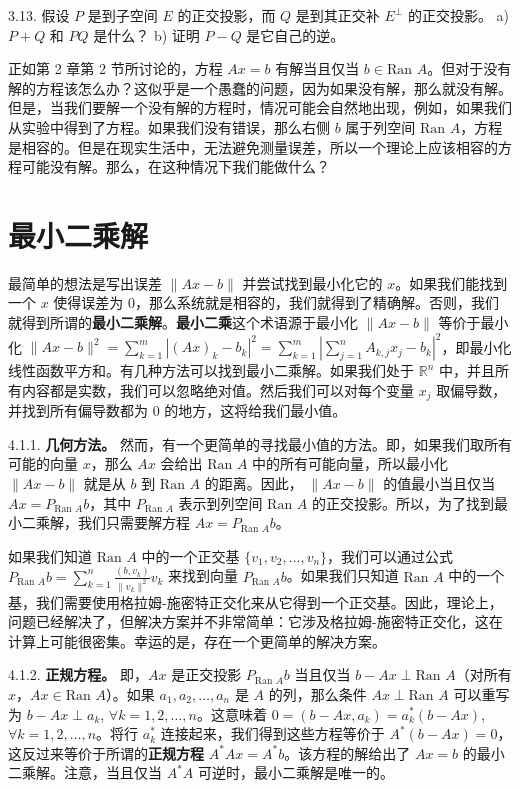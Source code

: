 3.13. 假设 $P$ 是到子空间 $E$ 的正交投影，而 $Q$ 是到其正交补 $E^\perp$ 的正交投影。
a) $P+Q$ 和 $PQ$ 是什么？
b) 证明 $P-Q$ 是它自己的逆。




正如第 2 章第 2 节所讨论的，方程 $Ax = b$ 有解当且仅当 $b \in \text{Ran } A$。但对于没有解的方程该怎么办？这似乎是一个愚蠢的问题，因为如果没有解，那么就没有解。但是，当我们要解一个没有解的方程时，情况可能会自然地出现，例如，如果我们从实验中得到了方程。如果我们没有错误，那么右侧 $b$ 属于列空间 $\text{Ran } A$，方程是相容的。但是在现实生活中，无法避免测量误差，所以一个理论上应该相容的方程可能没有解。那么，在这种情况下我们能做什么？

\section{最小二乘解} 

最简单的想法是写出误差 $\|Ax - b\|$ 并尝试找到最小化它的 $x$。如果我们能找到一个 $x$ 使得误差为 $0$，那么系统就是相容的，我们就得到了精确解。否则，我们就得到所谓的\textbf{最小二乘解}。\textbf{最小二乘}这个术语源于最小化 $\|Ax - b\|$ 等价于最小化 $\|Ax - b\|^2 = \sum_{k=1}^m |(Ax)_k - b_k|^2 = \sum_{k=1}^m |\sum_{j=1}^n A_{k,j} x_j - b_k|^2$，即最小化线性函数平方和。有几种方法可以找到最小二乘解。如果我们处于 $\mathbb{R}^n$ 中，并且所有内容都是实数，我们可以忽略绝对值。然后我们可以对每个变量 $x_j$ 取偏导数，并找到所有偏导数都为 $0$ 的地方，这将给我们最小值。

4.1.1. \textbf{几何方法。} 然而，有一个更简单的寻找最小值的方法。即，如果我们取所有可能的向量 $x$，那么 $Ax$ 会给出 $\text{Ran } A$ 中的所有可能向量，所以最小化 $\|Ax - b\|$ 就是从 $b$ 到 $\text{Ran } A$ 的距离。因此， $\|Ax - b\|$ 的值最小当且仅当 $Ax = P_{\text{Ran } A} b$，其中 $P_{\text{Ran } A}$ 表示到列空间 $\text{Ran } A$ 的正交投影。所以，为了找到最小二乘解，我们只需要解方程 $Ax = P_{\text{Ran } A} b$。

如果我们知道 $\text{Ran } A$ 中的一个正交基 $\{v_1, v_2, \dots, v_n\}$，我们可以通过公式 $P_{\text{Ran } A} b = \sum_{k=1}^n \frac{(b, v_k)}{\|v_k\|^2} v_k$ 来找到向量 $P_{\text{Ran } A} b$。如果我们只知道 $\text{Ran } A$ 中的一个基，我们需要使用格拉姆-施密特正交化来从它得到一个正交基。因此，理论上，问题已经解决了，但解决方案并不非常简单：它涉及格拉姆-施密特正交化，这在计算上可能很密集。幸运的是，存在一个更简单的解决方案。

4.1.2. \textbf{正规方程。} 即，$Ax$ 是正交投影 $P_{\text{Ran } A} b$ 当且仅当 $b - Ax \perp \text{Ran } A$（对所有 $x$，$Ax \in \text{Ran } A$）。如果 $a_1, a_2, \dots, a_n$ 是 $A$ 的列，那么条件 $A x \perp \text{Ran } A$ 可以重写为 $b - Ax \perp a_k$, $\forall k = 1, 2, \dots, n$。这意味着 $0 = (b - Ax, a_k) = a_k^*(b - Ax)$, $\forall k = 1, 2, \dots, n$。将行 $a_k^*$ 连接起来，我们得到这些方程等价于
$A^*(b - Ax) = 0$，
这反过来等价于所谓的\textbf{正规方程} $A^*Ax = A^*b$。该方程的解给出了 $Ax = b$ 的最小二乘解。注意，当且仅当 $A^*A$ 可逆时，最小二乘解是唯一的。

